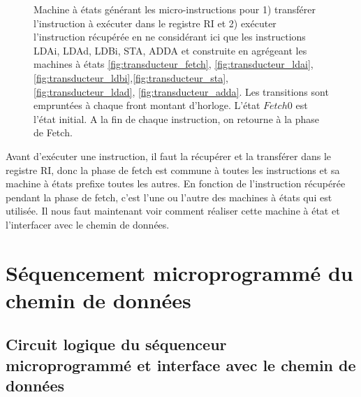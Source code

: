 \begin{figure}[htbp]
  \caption{\label{fig:transducteur_seq} Machine à états générant les micro-instructions pour 1) transférer l'instruction à exécuter dans le registre RI et 2) exécuter l'instruction récupérée en ne considérant ici que les instructions LDAi, LDAd, LDBi, STA, ADDA et construite en agrégeant les machines à états \ref{fig:transducteur_fetch}, \ref{fig:transducteur_ldai},\ref{fig:transducteur_ldbi},\ref{fig:transducteur_sta},\ref{fig:transducteur_ldad}, \ref{fig:transducteur_adda}. Les transitions sont empruntées à chaque front montant d'horloge. L'état $Fetch0$ est l'état initial. A la fin de chaque instruction, on retourne à la phase de Fetch.}
\end{figure}

Avant d'exécuter une instruction, il faut la récupérer et la transférer dans le registre RI, donc la phase de fetch est commune à toutes les instructions et sa machine à états prefixe toutes les autres. En fonction de l'instruction récupérée pendant la phase de fetch, c'est l'une ou l'autre des machines à états qui est utilisée. Il nous faut maintenant voir comment réaliser cette machine à état et l'interfacer avec le chemin de données.


\section{Séquencement microprogrammé du chemin de données}

\subsection{Circuit logique du séquenceur microprogrammé et interface avec le chemin de données}

